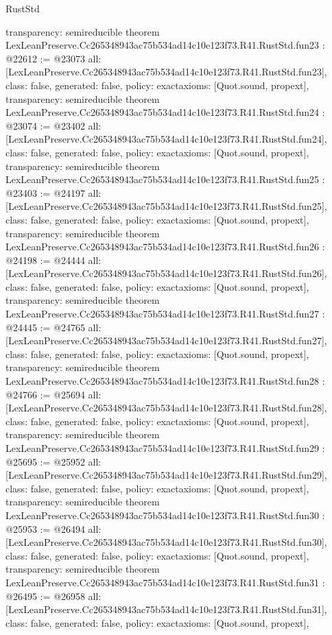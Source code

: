 \begin{lexlean}{RustStd}
\begin{coremodule}
{  transparency: semireducible
}
theorem LexLeanPreserve.Cc265348943ac75b534ad14c10e123f73.R41.RustStd.fun23 : @22612 := @23073 {
  all: [LexLeanPreserve.Cc265348943ac75b534ad14c10e123f73.R41.RustStd.fun23],
  class: false,
  generated: false,
  policy: exact{axioms: [Quot.sound, propext]},
  transparency: semireducible
}
theorem LexLeanPreserve.Cc265348943ac75b534ad14c10e123f73.R41.RustStd.fun24 : @23074 := @23402 {
  all: [LexLeanPreserve.Cc265348943ac75b534ad14c10e123f73.R41.RustStd.fun24],
  class: false,
  generated: false,
  policy: exact{axioms: [Quot.sound, propext]},
  transparency: semireducible
}
theorem LexLeanPreserve.Cc265348943ac75b534ad14c10e123f73.R41.RustStd.fun25 : @23403 := @24197 {
  all: [LexLeanPreserve.Cc265348943ac75b534ad14c10e123f73.R41.RustStd.fun25],
  class: false,
  generated: false,
  policy: exact{axioms: [Quot.sound, propext]},
  transparency: semireducible
}
theorem LexLeanPreserve.Cc265348943ac75b534ad14c10e123f73.R41.RustStd.fun26 : @24198 := @24444 {
  all: [LexLeanPreserve.Cc265348943ac75b534ad14c10e123f73.R41.RustStd.fun26],
  class: false,
  generated: false,
  policy: exact{axioms: [Quot.sound, propext]},
  transparency: semireducible
}
theorem LexLeanPreserve.Cc265348943ac75b534ad14c10e123f73.R41.RustStd.fun27 : @24445 := @24765 {
  all: [LexLeanPreserve.Cc265348943ac75b534ad14c10e123f73.R41.RustStd.fun27],
  class: false,
  generated: false,
  policy: exact{axioms: [Quot.sound, propext]},
  transparency: semireducible
}
theorem LexLeanPreserve.Cc265348943ac75b534ad14c10e123f73.R41.RustStd.fun28 : @24766 := @25694 {
  all: [LexLeanPreserve.Cc265348943ac75b534ad14c10e123f73.R41.RustStd.fun28],
  class: false,
  generated: false,
  policy: exact{axioms: [Quot.sound, propext]},
  transparency: semireducible
}
theorem LexLeanPreserve.Cc265348943ac75b534ad14c10e123f73.R41.RustStd.fun29 : @25695 := @25952 {
  all: [LexLeanPreserve.Cc265348943ac75b534ad14c10e123f73.R41.RustStd.fun29],
  class: false,
  generated: false,
  policy: exact{axioms: [Quot.sound, propext]},
  transparency: semireducible
}
theorem LexLeanPreserve.Cc265348943ac75b534ad14c10e123f73.R41.RustStd.fun30 : @25953 := @26494 {
  all: [LexLeanPreserve.Cc265348943ac75b534ad14c10e123f73.R41.RustStd.fun30],
  class: false,
  generated: false,
  policy: exact{axioms: [Quot.sound, propext]},
  transparency: semireducible
}
theorem LexLeanPreserve.Cc265348943ac75b534ad14c10e123f73.R41.RustStd.fun31 : @26495 := @26958 {
  all: [LexLeanPreserve.Cc265348943ac75b534ad14c10e123f73.R41.RustStd.fun31],
  class: false,
  generated: false,
  policy: exact{axioms: [Quot.sound, propext]},
}
\end{coremodule}
\end{lexlean}
